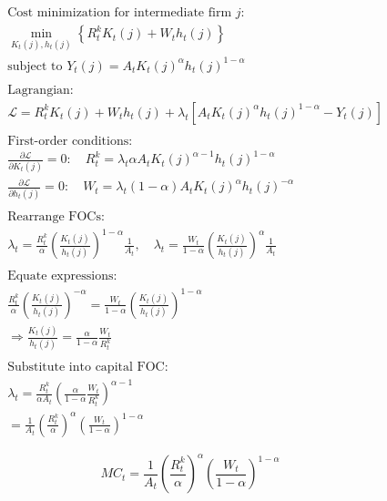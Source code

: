 \documentclass[11pt,preprint]{elsarticle}
\numberwithin{equation}{section}
\numberwithin{figure}{section}
\numberwithin{table}{section}
\begin{document}
\begin{align*}
& \text{Cost minimization for intermediate firm } j: \\
& \min_{K_t(j), h_t(j)} \left\{ R_t^k K_t(j) + W_t h_t(j) \right\} \\
& \text{subject to } Y_t(j) = A_t K_t(j)^{\alpha} h_t(j)^{1-\alpha} \\
& \\
& \text{Lagrangian:} \\
& \mathcal{L} = R_t^k K_t(j) + W_t h_t(j) + \lambda_t \left[ A_t K_t(j)^{\alpha} h_t(j)^{1-\alpha} - Y_t(j) \right] \\
& \\
& \text{First-order conditions:} \\
& \frac{\partial \mathcal{L}}{\partial K_t(j)} = 0: \quad R_t^k = \lambda_t \alpha A_t K_t(j)^{\alpha-1} h_t(j)^{1-\alpha} \\
& \frac{\partial \mathcal{L}}{\partial h_t(j)} = 0: \quad W_t = \lambda_t (1-\alpha) A_t K_t(j)^{\alpha} h_t(j)^{-\alpha} \\
& \\
& \text{Rearrange FOCs:} \\
& \lambda_t = \frac{R_t^k}{\alpha} \left( \frac{K_t(j)}{h_t(j)} \right)^{1-\alpha} \frac{1}{A_t}, \quad 
\lambda_t = \frac{W_t}{1-\alpha} \left( \frac{K_t(j)}{h_t(j)} \right)^{\alpha} \frac{1}{A_t} \\
& \\
& \text{Equate expressions:} \\
& \frac{R_t^k}{\alpha} \left( \frac{K_t(j)}{h_t(j)} \right)^{-\alpha} = \frac{W_t}{1-\alpha} \left( \frac{K_t(j)}{h_t(j)} \right)^{1-\alpha} \\
& \Rightarrow \frac{K_t(j)}{h_t(j)} = \frac{\alpha}{1-\alpha} \frac{W_t}{R_t^k} \\
& \\
& \text{Substitute into capital FOC:} \\
& \lambda_t = \frac{R_t^k}{\alpha A_t} \left( \frac{\alpha}{1-\alpha} \frac{W_t}{R_t^k} \right)^{\alpha-1} \\
& = \frac{1}{A_t} \left( \frac{R_t^k}{\alpha} \right)^{\alpha} \left( \frac{W_t}{1-\alpha} \right)^{1-\alpha}
\end{align*}

\begin{equation}\label{marginal_cost}
\boxed{MC_t = \dfrac{1}{A_t} \left( \dfrac{R_t^k}{\alpha} \right)^{\alpha} \left( \dfrac{W_t}{1-\alpha} \right)^{1-\alpha}}
\end{equation}
\end{document}
